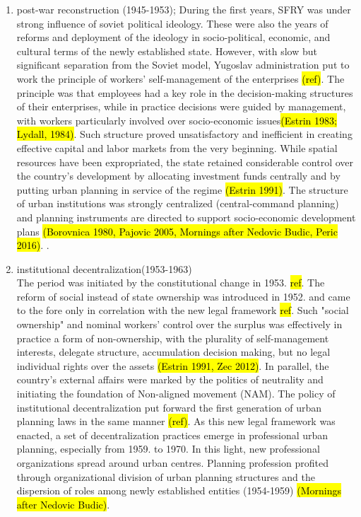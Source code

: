 \documentclass[11pt]{report}
\begin{document}
\begin{enumerate}
\item  post-war reconstruction (1945-1953);
During the first years, SFRY was under strong influence of soviet political ideology. These were also the years of reforms and deployment of the ideology in socio-political, economic, and cultural terms of the newly established state. However, with slow but significant separation from the Soviet model, Yugoslav administration put to work the principle of workers' self-management of the enterprises \hl{(ref)}. The principle was that employees  had  a  key  role  in  the  decision-making structures  of  their enterprises, while in practice decisions  were  guided  by  management,  with  workers particularly  involved over socio-economic issues\footnotemark \hl{(Estrin 1983; Lydall,  1984)}. Such structure proved unsatisfactory and inefficient in creating effective capital  and  labor  markets from the very beginning.
While spatial resources have been expropriated, the state retained considerable control over the country's development by allocating investment  funds centrally and by putting urban planning in service of the regime \hl{(Estrin 1991)}. The structure of urban institutions was strongly centralized (central-command planning) and planning instruments are directed to support socio-economic development plans \hl{(Borovnica 1980, Pajovic 2005, Mornings after Nedovic Budic, Peric 2016)}. 
.
\item  institutional decentralization(1953-1963)
\\
The period was initiated by the constitutional change in 1953. \hl{ref}. The reform of social instead of state ownership was introduced in 1952. and came to the fore only in correlation with the new legal framework \hl{ref}. Such "social ownership" and nominal workers' control over the surplus was effectively in practice a form of non-ownership, with the plurality of self-management interests, delegate structure, accumulation decision making, but no legal individual rights over the assets \hl{(Estrin 1991, Zec 2012)}. In parallel, the country's external affairs were marked by the politics of neutrality and initiating the foundation of Non-aligned movement (NAM). The policy of institutional decentralization put forward the first generation of urban planning laws in the same manner \hl{(ref)}. As this new legal framework was enacted, a set of decentralization practices emerge in professional urban planning, especially from 1959. to 1970. In this light, new professional organizations spread around urban centres. Planning profession profited through organizational division of urban planning structures and the dispersion of roles among newly established entities (1954-1959) \hl{(Mornings after Nedovic Budic)}. 

\end{enumerate}
\end{document}
